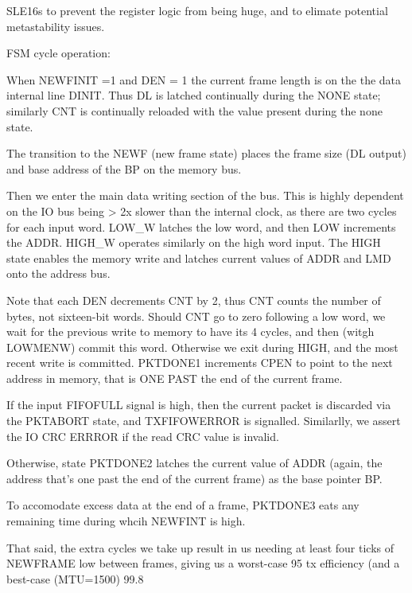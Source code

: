 SLE16s to prevent the register logic from being huge, and to elimate
potential metastability issues.


FSM cycle operation:

When NEWFINIT =1 and DEN = 1 the current frame length is on the the data internal line DINIT. Thus DL is latched continually during the NONE state; similarly CNT is continually reloaded with the value present during the none state. 

The transition to the NEWF (new frame state) places the frame size (DL output) and base address of the BP on the memory bus.

Then we enter the main data writing section of the bus. This is highly
dependent on the IO bus being > 2x slower than the internal clock, as
there are two cycles for each input word. LOW_W latches the low word,
and then LOW increments the ADDR. HIGH_W operates similarly on the
high word input. The HIGH state enables the memory write and latches
current values of ADDR and LMD onto the address bus.

Note that each DEN decrements CNT by 2, thus CNT counts the number of
bytes, not sixteen-bit words. Should CNT go to zero following a low
word, we wait for the previous write to memory to have its 4 cycles,
and then (witgh LOWMENW) commit this word. Otherwise we exit during
HIGH, and the most recent write is committed. PKTDONE1 increments CPEN
to point to the next address in memory, that is ONE PAST the end of
the current frame.

If the input FIFOFULL signal is high, then the current packet is
discarded via the PKTABORT state, and TXFIFOWERROR is
signalled. Similarlly, we assert the IO CRC ERRROR if the read CRC value is invalid. 

Otherwise, state PKTDONE2 latches the current value of ADDR
(again, the address that's one past the end of the current frame) as
the base pointer BP.

To accomodate excess data at the end of a frame, PKTDONE3 eats any
remaining time during whcih NEWFINT is high.

That said, the extra cycles we take up result in us needing at least
four ticks of NEWFRAME low between frames, giving us a worst-case 95%
tx efficiency (and a best-case (MTU=1500) 99.8%

